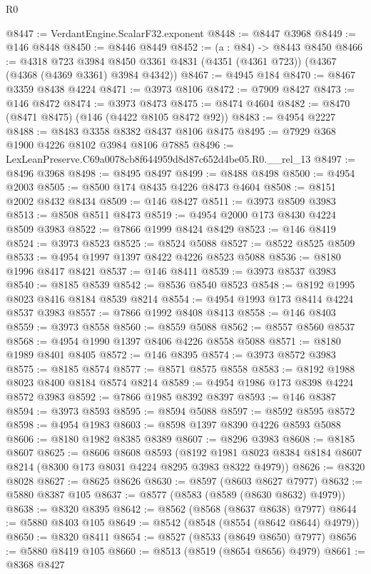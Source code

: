 \begin{lexlean}{R0}
\begin{coremodule}
@8447 := VerdantEngine.ScalarF32.exponent
@8448 := @8447 @3968
@8449 := @146 @8448
@8450 := @8446 @8449
@8452 := (a : @84) -> @8443 @8450
@8466 := @4318
    @723
    @3984
    @8450
    @3361
    @4831
    (@4351 (@4361 @723))
    (@4367 (@4368 (@4369 @3361) @3984 @4342))
@8467 := @4945 @184
@8470 := @8467 @3359 @8438 @4224
@8471 := @3973 @8106
@8472 := @7909 @8427
@8473 := @146 @8472
@8474 := @3973 @8473
@8475 := @8474 @4604
@8482 := @8470 (@8471 @8475) (@146 (@4422 @8105 @8472 @92))
@8483 := @4954 @2227
@8488 := @8483 @3358 @8382 @8437 @8106 @8475
@8495 := @7929 @368 @1900 @4226 @8102 @3984 @8106 @7885
@8496 := LexLeanPreserve.C69a0078cb8f644959d8d87c652d4be05.R0.__rel_13
@8497 := @8496 @3968
@8498 := @8495 @8497
@8499 := @8488 @8498
@8500 := @4954 @2003
@8505 := @8500 @174 @8435 @4226 @8473 @4604
@8508 := @8151 @2002 @8432 @8434
@8509 := @146 @8427
@8511 := @3973 @8509 @3983
@8513 := @8508 @8511 @8473
@8519 := @4954 @2000 @173 @8430 @4224 @8509 @3983
@8522 := @7866 @1999 @8424 @8429
@8523 := @146 @8419
@8524 := @3973 @8523
@8525 := @8524 @5088
@8527 := @8522 @8525 @8509
@8533 := @4954 @1997 @1397 @8422 @4226 @8523 @5088
@8536 := @8180 @1996 @8417 @8421
@8537 := @146 @8411
@8539 := @3973 @8537 @3983
@8540 := @8185 @8539
@8542 := @8536 @8540 @8523
@8548 := @8192 @1995 @8023 @8416 @8184 @8539 @8214
@8554 := @4954 @1993 @173 @8414 @4224 @8537 @3983
@8557 := @7866 @1992 @8408 @8413
@8558 := @146 @8403
@8559 := @3973 @8558
@8560 := @8559 @5088
@8562 := @8557 @8560 @8537
@8568 := @4954 @1990 @1397 @8406 @4226 @8558 @5088
@8571 := @8180 @1989 @8401 @8405
@8572 := @146 @8395
@8574 := @3973 @8572 @3983
@8575 := @8185 @8574
@8577 := @8571 @8575 @8558
@8583 := @8192 @1988 @8023 @8400 @8184 @8574 @8214
@8589 := @4954 @1986 @173 @8398 @4224 @8572 @3983
@8592 := @7866 @1985 @8392 @8397
@8593 := @146 @8387
@8594 := @3973 @8593
@8595 := @8594 @5088
@8597 := @8592 @8595 @8572
@8598 := @4954 @1983
@8603 := @8598 @1397 @8390 @4226 @8593 @5088
@8606 := @8180 @1982 @8385 @8389
@8607 := @8296 @3983
@8608 := @8185 @8607
@8625 := @8606
    @8608
    @8593
    (@8192 @1981 @8023 @8384 @8184 @8607 @8214 (@8300 @173 @8031 @4224 @8295 @3983 @8322 @4979))
@8626 := @8320 @8028
@8627 := @8625 @8626
@8630 := @8597 (@8603 @8627 @7977)
@8632 := @5880 @8387 @105
@8637 := @8577 (@8583 (@8589 (@8630 @8632) @4979))
@8638 := @8320 @8395
@8642 := @8562 (@8568 (@8637 @8638) @7977)
@8644 := @5880 @8403 @105
@8649 := @8542 (@8548 (@8554 (@8642 @8644) @4979))
@8650 := @8320 @8411
@8654 := @8527 (@8533 (@8649 @8650) @7977)
@8656 := @5880 @8419 @105
@8660 := @8513 (@8519 (@8654 @8656) @4979)
@8661 := @8368 @8427

\end{coremodule}
\end{lexlean}
